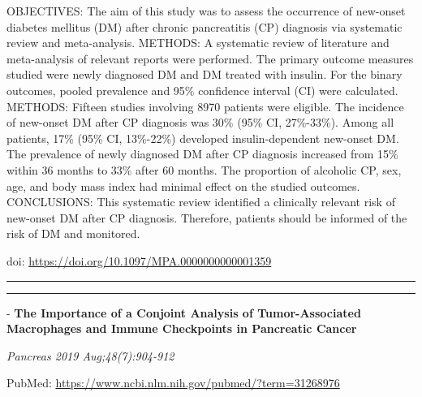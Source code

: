 \documentclass[]{article}
\begin{document}
OBJECTIVES: The aim of this study was to assess the occurrence of
new-onset diabetes mellitus (DM) after chronic pancreatitis (CP)
diagnosis via systematic review and meta-analysis. METHODS: A systematic
review of literature and meta-analysis of relevant reports were
performed. The primary outcome measures studied were newly diagnosed DM
and DM treated with insulin. For the binary outcomes, pooled prevalence
and 95\% confidence interval (CI) were calculated. METHODS: Fifteen
studies involving 8970 patients were eligible. The incidence of
new-onset DM after CP diagnosis was 30\% (95\% CI, 27\%-33\%). Among all
patients, 17\% (95\% CI, 13\%-22\%) developed insulin-dependent
new-onset DM. The prevalence of newly diagnosed DM after CP diagnosis
increased from 15\% within 36 months to 33\% after 60 months. The
proportion of alcoholic CP, sex, age, and body mass index had minimal
effect on the studied outcomes. CONCLUSIONS: This systematic review
identified a clinically relevant risk of new-onset DM after CP
diagnosis. Therefore, patients should be informed of the risk of DM and
monitored.

doi: \url{https://doi.org/10.1097/MPA.0000000000001359}

{}

{}

\begin{center}\rule{0.5\linewidth}{\linethickness}\end{center}

\begin{center}\rule{0.5\linewidth}{\linethickness}\end{center}

 - \textbf{The Importance of a Conjoint Analysis of Tumor-Associated
Macrophages and Immune Checkpoints in Pancreatic Cancer}

\emph{Pancreas 2019 Aug;48(7):904-912}

PubMed: \url{https://www.ncbi.nlm.nih.gov/pubmed/?term=31268976}
\end{document}
